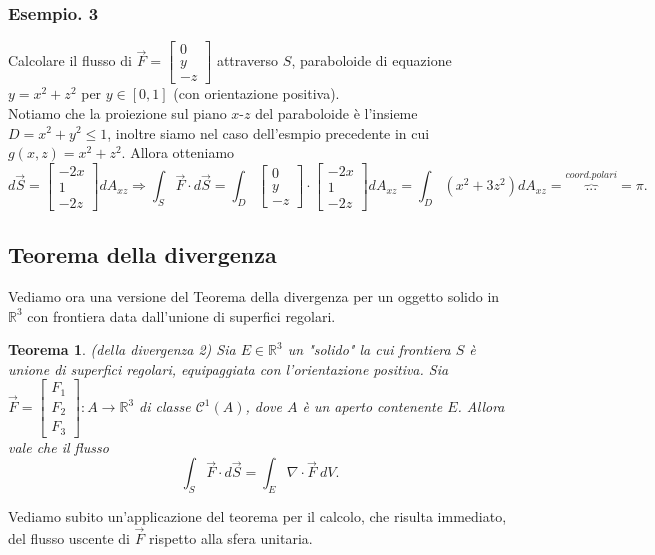 \documentclass[10pt]{article}
\theoremstyle{plain}
\newtheorem{thm}{Teorema}[section]
\theoremstyle{definition}
\begin{document}
\subsubsection{Esempio. 3}
Calcolare il flusso di $\vec{F}=\begin{bmatrix}
0\\ y\\ -z
\end{bmatrix}$ attraverso $S$, paraboloide di equazione $y=x^2+z^2$ per $y\in [0,1]$ (con orientazione positiva).
\\ Notiamo che la proiezione sul piano $x$-$z$ del paraboloide è l'insieme $D={x^2+y^2\leq 1}$, inoltre siamo nel caso dell'esmpio precedente in cui $g(x,z)=x^2+z^2$. 
Allora otteniamo 
$$ d\vec{S} = \begin{bmatrix}
-2x \\
1\\
-2z
\end{bmatrix}dA_{xz} \Longrightarrow \int_S \vec{F} \cdot d\vec{S}=\int_D \begin{bmatrix}
0\\ y\\ -z
\end{bmatrix} \cdot
\begin{bmatrix}
-2x \\
1\\
-2z
\end{bmatrix} dA_{xz} = \int_D (x^2 + 3z^2 ) dA_{xz} =\overbrace{ ...}^{coord. polari} = \pi.
$$
\subsection{Teorema della divergenza}
Vediamo ora una versione del Teorema della divergenza per un oggetto solido in $\mathbb{R}^3$ con frontiera data dall'unione di superfici regolari.
\begin{thm} \label{th. divergenza_3dim}
(della divergenza 2)
Sia $E\in \mathbb{R}^3$ un "solido" la cui frontiera $S$ è unione di superfici regolari, equipaggiata con l'orientazione positiva. Sia $\vec{F}=\begin{bmatrix}
F_1\\ F_2 \\  F_3
\end{bmatrix}:A\to \mathbb{R}^3$  di classe $\mathcal{C}^1(A)$, dove $A$ è un aperto contenente $E$. Allora vale che il flusso 
$$ \int_S \vec{F}\cdot d\vec{S} =\int_E \nabla \cdot \vec{F} \ dV.
$$
\end{thm}
\bigskip
Vediamo subito un'applicazione del teorema per il calcolo, che risulta immediato, del flusso uscente di $\vec{F}$ rispetto alla sfera unitaria.
\end{document}
